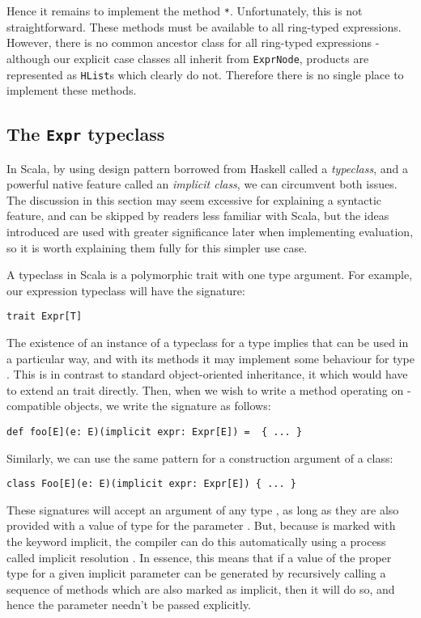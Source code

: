 Hence it remains to implement the method \lstinline{*}. Unfortunately, this is not straightforward. These methods must be available to all ring-typed expressions. However, there is no common ancestor class for all ring-typed expressions - although our explicit case classes all inherit from \lstinline{ExprNode}, products are represented as \lstinline{HList}s which clearly do not. Therefore there is no single place to implement these methods.

\subsection{The \lstinline{Expr} typeclass}

In Scala, by using design pattern borrowed from Haskell called a \textit{typeclass}, and a powerful native feature called an \textit{implicit class}, we can circumvent both issues. The discussion in this section may seem excessive for explaining a syntactic feature, and can be skipped by readers less familiar with Scala, but the ideas introduced are used with greater significance later when implementing evaluation, so it is worth explaining them fully for this simpler use case.

A typeclass in Scala is a polymorphic trait with one type argument. For example, our expression typeclass will have the signature:

\vs \begin{lstlisting}
trait Expr[T]
\end{lstlisting}

The existence of an instance of a typeclass for a type  implies that  can be used in a particular way, and with its methods it may implement some behaviour for type . This is in contrast to standard object-oriented inheritance, it which  would have to extend an  trait directly. Then, when we wish to write a method operating on -compatible objects, we write the signature as follows:

\vs \begin{lstlisting}
def foo[E](e: E)(implicit expr: Expr[E]) =  { ... }
\end{lstlisting} \vs
Similarly, we can use the same pattern for a construction argument of a class:
\vs \begin{lstlisting}
class Foo[E](e: E)(implicit expr: Expr[E]) { ... }
\end{lstlisting} \vs

These signatures will accept an argument of any type , as long as they are also provided with a value of type  for the parameter . But, because  is marked with the keyword implicit, the compiler can do this automatically using a process called implicit resolution \cite{implicitresolution}. In essence, this means that if a value of the proper type for a given implicit parameter can be generated by recursively calling a sequence of methods which are also marked as implicit, then it will do so, and hence the parameter needn't be passed explicitly.

